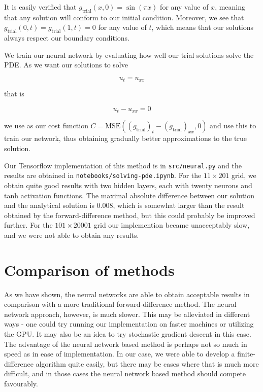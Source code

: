 \documentclass{article}
\begin{document}
It is easily verified that $g_{\textrm{trial}}(x, 0) = \sin(\pi x)$ for any value of $x$, meaning that any solution will conform to our initial condition. Moreover, we see that $g_{\textrm{trial}}(0, t) = g_{\textrm{trial}}(1, t) = 0$ for any value of $t$, which means that our solutions always respect our boundary conditions.

We train our neural network by evaluating how well our trial solutions solve the PDE. As we want our solutions to solve

\begin{equation}
    u_t = u_{xx}
\end{equation}

that is

\begin{equation}
    u_t - u_{xx} = 0
\end{equation}

we use as our cost function $C = \textrm{MSE}((g_{\textrm{trial}})_t - (g_{\textrm{trial}})_{xx}, 0)$ and use this to train our network, thus obtaining gradually better approximations to the true solution.

Our Tensorflow implementation of this method is in \texttt{src/neural.py} and the results are obtained in \texttt{notebooks/solving-pde.ipynb}. For the $11 \times 201$ grid, we obtain quite good results with two hidden layers, each with twenty neurons and tanh activation functions. The maximal absolute difference between our solution and the analytical solution is 0.008, which is somewhat larger than the result obtained by the forward-difference method, but this could probably be improved further. For the $101 \times 20001$ grid our implemention became unacceptably slow, and we were not able to obtain any results.

\section{Comparison of methods}
As we have shown, the neural networks are able to obtain acceptable results in comparison with a more traditional forward-difference method. The neural network approach, however, is much slower. This may be alleviated in different ways - one could try running our implementation on faster machines or utilizing the GPU. It may also be an idea to try stochastic gradient descent in this case. The advantage of the neural network based method is perhaps not so much in speed as in ease of implementation. In our case, we were able to develop a finite-difference algorithm quite easily, but there may be cases where that is much more difficult, and in those cases the neural network based method should compete favourably.
\end{document}
